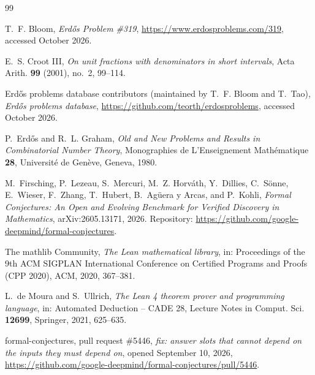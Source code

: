 \documentclass[11pt]{amsart}
\theoremstyle{plain}
\theoremstyle{definition}
\begin{document}
\begin{thebibliography}{99}

T.~F. Bloom, \emph{Erd\H{o}s Problem \#319}, \url{https://www.erdosproblems.com/319}, accessed October 2026.

E.~S. Croot III, \emph{On unit fractions with denominators in short intervals}, Acta Arith. \textbf{99} (2001), no.~2, 99--114.

Erd\H{o}s problems database contributors (maintained by T.~F. Bloom and T.~Tao), \emph{Erd\H{o}s problems database}, \url{https://github.com/teorth/erdosproblems}, accessed October 2026.

P.~Erd\H{o}s and R.~L. Graham, \emph{Old and New Problems and Results in Combinatorial Number Theory}, Monographies de L'Enseignement Math\'ematique \textbf{28}, Universit\'e de Gen\`eve, Geneva, 1980.

M.~Firsching, P.~Lezeau, S.~Mercuri, M.~Z. Horv\'ath, Y.~Dillies, C.~S\"onne, E.~Wieser, F.~Zhang, T.~Hubert, B.~Ag\"uera y Arcas, and P.~Kohli, \emph{Formal Conjectures: An Open and Evolving Benchmark for Verified Discovery in Mathematics}, arXiv:2605.13171, 2026. Repository: \url{https://github.com/google-deepmind/formal-conjectures}.

The mathlib Community, \emph{The Lean mathematical library}, in: Proceedings of the 9th ACM SIGPLAN International Conference on Certified Programs and Proofs (CPP 2020), ACM, 2020, 367--381.

L.~de Moura and S.~Ullrich, \emph{The Lean 4 theorem prover and programming language}, in: Automated Deduction -- CADE 28, Lecture Notes in Comput. Sci. \textbf{12699}, Springer, 2021, 625--635.

formal-conjectures, pull request \#5446, \emph{fix: answer slots that cannot depend on the inputs they must depend on}, opened September 10, 2026, \url{https://github.com/google-deepmind/formal-conjectures/pull/5446}.

\end{thebibliography}
\end{document}
